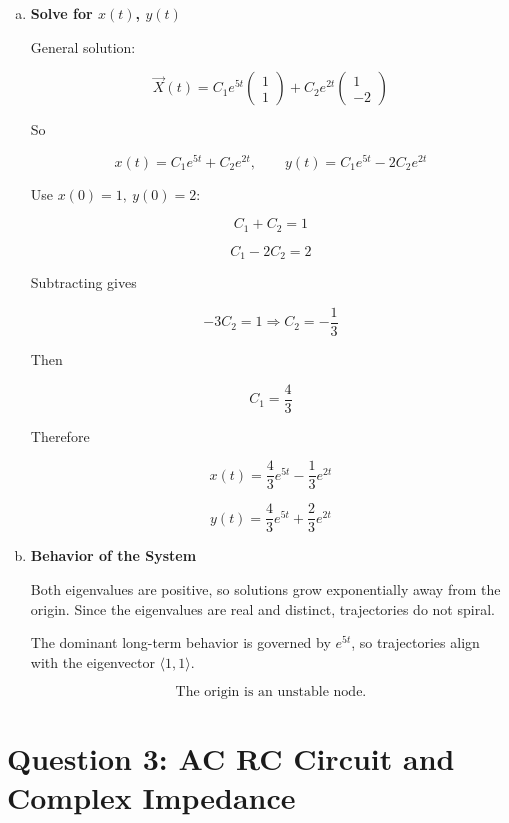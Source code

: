 \documentclass[12pt]{article}
\begin{document}
\begin{enumerate}[a)]
\[
2x+y=0 \Rightarrow y=-2x
\]

\[
\boxed{
\vec v_2=
\begin{pmatrix}
1\\-2
\end{pmatrix}}
\]

\item \textbf{Solve for \(x(t)\), \(y(t)\)}

General solution:

\[
\vec X(t)=
C_1 e^{5t}
\begin{pmatrix}
1\\1
\end{pmatrix}
+
C_2 e^{2t}
\begin{pmatrix}
1\\-2
\end{pmatrix}
\]

So

\[
x(t)=C_1e^{5t}+C_2e^{2t},
\qquad
y(t)=C_1e^{5t}-2C_2e^{2t}
\]

Use \(x(0)=1,\ y(0)=2\):

\[
C_1+C_2=1
\]

\[
C_1-2C_2=2
\]

Subtracting gives

\[
-3C_2=1
\Rightarrow
C_2=-\frac13
\]

Then

\[
C_1=\frac43
\]

Therefore

\[
\boxed{
x(t)=\frac43e^{5t}-\frac13e^{2t}}
\]

\[
\boxed{
y(t)=\frac43e^{5t}+\frac23e^{2t}}
\]

\item \textbf{Behavior of the System}

Both eigenvalues are positive, so solutions grow exponentially away from the origin. Since the eigenvalues are real and distinct, trajectories do not spiral.

The dominant long-term behavior is governed by \(e^{5t}\), so trajectories align with the eigenvector \(\langle1,1\rangle\).

\[
\boxed{\text{The origin is an unstable node.}}
\]

\end{enumerate}

\newpage

\section*{Question 3: AC RC Circuit and Complex Impedance}
\end{document}
